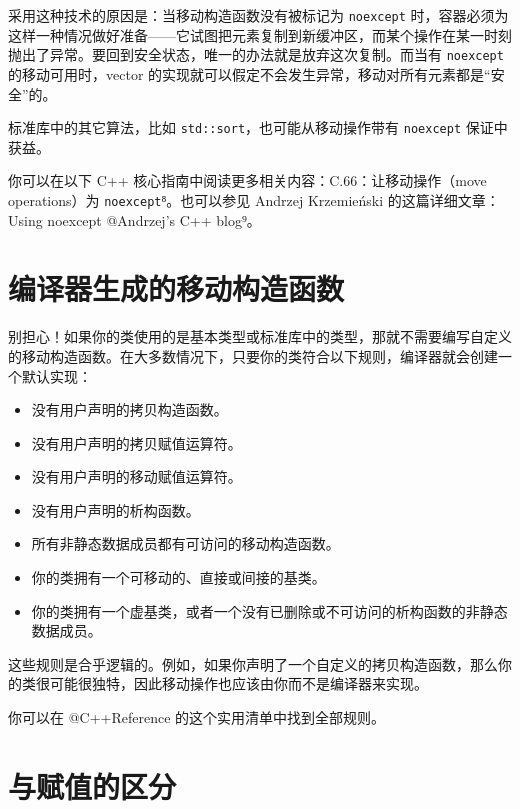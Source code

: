 采用这种技术的原因是：当移动构造函数没有被标记为 \texttt{noexcept} 时，容器必须为这样一种情况做好准备——它试图把元素复制到新缓冲区，而某个操作在某一时刻抛出了异常。要回到安全状态，唯一的办法就是放弃这次复制。而当有 \texttt{noexcept} 的移动可用时，vector 的实现就可以假定不会发生异常，移动对所有元素都是“安全”的。

标准库中的其它算法，比如 \texttt{std::sort}，也可能从移动操作带有 \texttt{noexcept} 保证中获益。

你可以在以下 C++ 核心指南中阅读更多相关内容：C.66：让移动操作（move operations）为 \texttt{noexcept}⁸。也可以参见 Andrzej Krzemieński 的这篇详细文章：Using noexcept @Andrzej's C++ blog⁹。



\section{编译器生成的移动构造函数}

别担心！如果你的类使用的是基本类型或标准库中的类型，那就不需要编写自定义的移动构造函数。在大多数情况下，只要你的类符合以下规则，编译器就会创建一个默认实现：

\begin{itemize}
\item 没有用户声明的拷贝构造函数。
\item 没有用户声明的拷贝赋值运算符。
\item 没有用户声明的移动赋值运算符。
\item 没有用户声明的析构函数。
\item 所有非静态数据成员都有可访问的移动构造函数。
\item 你的类拥有一个可移动的、直接或间接的基类。
\item 你的类拥有一个虚基类，或者一个没有已删除或不可访问的析构函数的非静态数据成员。
\end{itemize}

这些规则是合乎逻辑的。例如，如果你声明了一个自定义的拷贝构造函数，那么你的类很可能很独特，因此移动操作也应该由你而不是编译器来实现。

你可以在 @C++Reference 的这个实用清单中找到全部规则。

\section{与赋值的区分}

